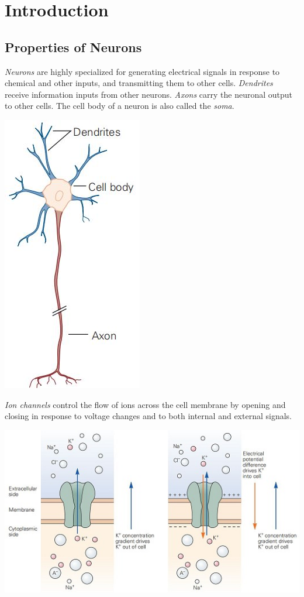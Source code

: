 \section{Introduction}
\subsection{Properties of Neurons}
\rem \emph{Neurons} are highly specialized for generating electrical signals in response to chemical and other inputs, and transmitting them to other cells. \emph{Dendrites} receive information inputs from other neurons. \emph{Axons} carry the neuronal output to other cells. The cell body of a neuron is also called the \emph{soma}.
\begin{center}
    \label{fig:1.1}
    \includegraphics[scale = 0.35]{png/Figure1-1}\\
\end{center}

\rem \emph{Ion channels} control the flow of ions across the cell membrane by opening and closing in response to voltage changes and to both internal and external signals.
\begin{center}
  \label{fig:1.2}
  \includegraphics[scale = 0.55]{png/Figure1-2}\\
\end{center}
  
